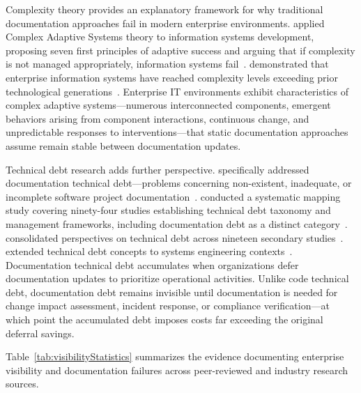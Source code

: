 Complexity theory provides an explanatory framework for why traditional documentation approaches fail in modern enterprise environments. \citeauthor{Benbya_McKelvey_2006} applied Complex Adaptive Systems theory to information systems development, proposing seven first principles of adaptive success and arguing that if complexity is not managed appropriately, information systems fail~\parencite{Benbya_McKelvey_2006}. \citeauthor{Benbya_Nan_Tanriverdi_Yoo_2020} demonstrated that enterprise information systems have reached complexity levels exceeding prior technological generations~\parencite{Benbya_Nan_Tanriverdi_Yoo_2020}. Enterprise IT environments exhibit characteristics of complex adaptive systems---numerous interconnected components, emergent behaviors arising from component interactions, continuous change, and unpredictable responses to interventions---that static documentation approaches assume remain stable between documentation updates.

Technical debt research adds further perspective. \citeauthor{Santos_2019} specifically addressed documentation technical debt---problems concerning non-existent, inadequate, or incomplete software project documentation~\parencite{Santos_2019}. \citeauthor{Li_Avgeriou_Liang_2015} conducted a systematic mapping study covering ninety-four studies establishing technical debt taxonomy and management frameworks, including documentation debt as a distinct category~\parencite{Li_Avgeriou_Liang_2015}. \citeauthor{Junior_Travassos_2022} consolidated perspectives on technical debt across nineteen secondary studies~\parencite{Junior_Travassos_2022}. \citeauthor{Kleinwaks_2023} extended technical debt concepts to systems engineering contexts~\parencite{Kleinwaks_2023}. Documentation technical debt accumulates when organizations defer documentation updates to prioritize operational activities. Unlike code technical debt, documentation debt remains invisible until documentation is needed for change impact assessment, incident response, or compliance verification---at which point the accumulated debt imposes costs far exceeding the original deferral savings.

Table~\ref{tab:visibilityStatistics} summarizes the evidence documenting enterprise visibility and documentation failures across peer-reviewed and industry research sources.

